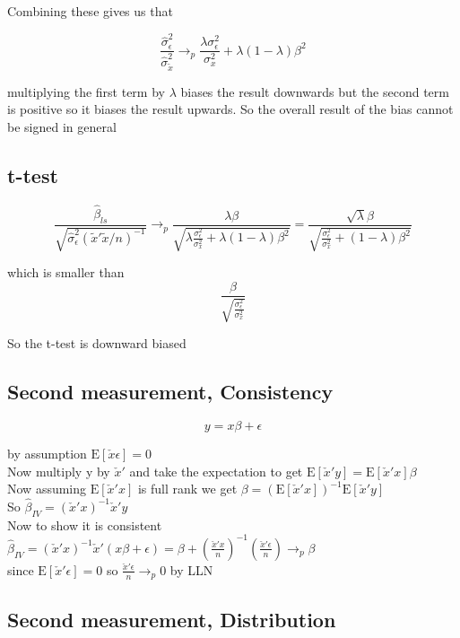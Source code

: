 \documentclass[11pt]{article}
\newcommand{\plim}{\rightarrow_{p}}
\newcommand{\E}{\mathrm{E}}
\begin{document}
Combining these gives us that 

$$ \frac{\hat{\sigma}_{\epsilon}^2}{\hat{\sigma}_{\tilde{x}}^2} \plim  \frac{\lambda \sigma_{\epsilon}^2}{\sigma_{x}^2} + \lambda(1-\lambda)\beta^2 $$

multiplying the first term by $\lambda$ biases the result downwards but the second term is positive so it biases the result upwards. So the overall result of the bias cannot be signed in general 

\subsection{t-test}

$$\frac{\hat{\beta}_{ls}}{\sqrt{\hat{\sigma}_{\epsilon}^2(\tilde{x}'\tilde{x}/n)^{-1}}} \plim \frac{\lambda \beta}{\sqrt{\lambda \frac{ \sigma_{\epsilon}^2}{\sigma_{x}^2} + \lambda(1-\lambda)\beta^2 }} 
= \frac{\sqrt{\lambda}\beta}{\sqrt{ \frac{ \sigma_{\epsilon}^2}{\sigma_{x}^2} + (1-\lambda)\beta^2 }}$$

which is smaller than 
$$ \frac{\beta}{\sqrt{\frac{\sigma_{\epsilon}^2}{\sigma_{x}^2}}}$$

So the t-test is downward biased 

\subsection{Second measurement, Consistency}

$$ y = x\beta + \epsilon$$


by assumption $ \E[\check{x} \epsilon] = 0 $ \\ 
Now multiply y by $ \check{x}'$ and take the expectation to get $ \E[\check{x}'y]=\E[\check{x}'x]\beta$ \\
Now assuming $\E[\check{x}'x]$ is full rank we get $\beta =(\E[\check{x}'x])^{-1}\E[\check{x}'y]$ \\
So $\hat{\beta}_{IV}=(\check{x}'x)^{-1}\check{x}'y$\\
Now to show it is consistent \\
$\hat{\beta}_{IV}=(\check{x}'x)^{-1}\check{x}'(x\beta  + \epsilon) = \beta + (\frac{\check{x}'x}{n})^{-1}(\frac{\check{x}'\epsilon}{n}) \plim \beta$ \\
since $\E[\check{x}'\epsilon] = 0$ so $\frac{\check{x}'\epsilon}{n} \plim 0$ by LLN

\subsection{Second measurement, Distribution}
\end{document}
